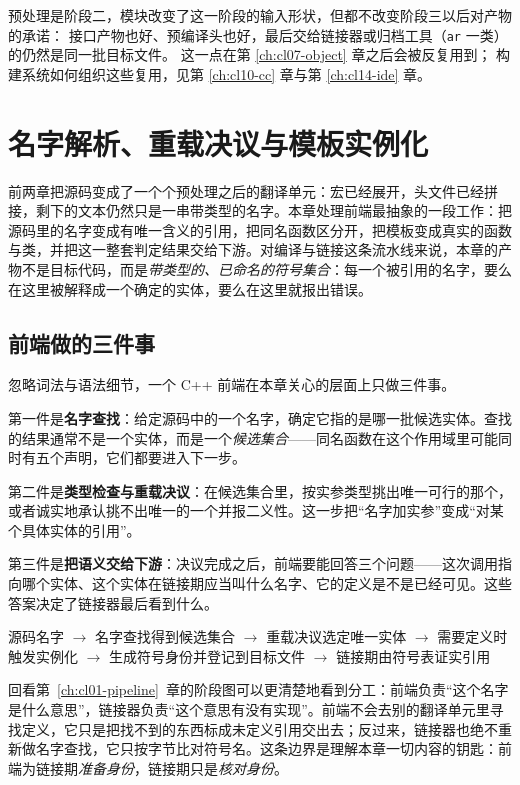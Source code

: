 \documentclass[12pt,a4paper,fontset=fandol]{ctexbook}
\newcommand{\cpp}[1]{C++#1}
\newcommand{\Tool}[1]{\texttt{#1}}
\begin{document}
预处理是阶段二，模块改变了这一阶段的输入形状，但都不改变阶段三以后对产物的承诺：
接口产物也好、预编译头也好，最后交给链接器或归档工具（\Tool{ar} 一类）的仍然是同一批目标文件。
这一点在第 \ref{ch:cl07-object} 章之后会被反复用到；
构建系统如何组织这些复用，见第 \ref{ch:cl10-cc} 章与第 \ref{ch:cl14-ide} 章。

\chapter{名字解析、重载决议与模板实例化}\label{ch:cl03-resolution}

前两章把源码变成了一个个预处理之后的翻译单元：宏已经展开，头文件已经拼接，剩下的文本仍然只是一串带类型的名字。本章处理前端最抽象的一段工作：把源码里的名字变成有唯一含义的引用，把同名函数区分开，把模板变成真实的函数与类，并把这一整套判定结果交给下游。对编译与链接这条流水线来说，本章的产物不是目标代码，而是\emph{带类型的、已命名的符号集合}：每一个被引用的名字，要么在这里被解释成一个确定的实体，要么在这里就报出错误。

\section{前端做的三件事}\label{sec:cl03-frontend-duty}

忽略词法与语法细节，一个 \cpp{} 前端在本章关心的层面上只做三件事。

第一件是\textbf{名字查找}：给定源码中的一个名字，确定它指的是哪一批候选实体。查找的结果通常不是一个实体，而是一个\emph{候选集合}——同名函数在这个作用域里可能同时有五个声明，它们都要进入下一步。

第二件是\textbf{类型检查与重载决议}：在候选集合里，按实参类型挑出唯一可行的那个，或者诚实地承认挑不出唯一的一个并报二义性。这一步把“名字加实参”变成“对某个具体实体的引用”。

第三件是\textbf{把语义交给下游}：决议完成之后，前端要能回答三个问题——这次调用指向哪个实体、这个实体在链接期应当叫什么名字、它的定义是不是已经可见。这些答案决定了链接器最后看到什么。

\begin{flow}[title={从源码名字到链接期身份：前端的三段准备}]
源码名字 $\to$ 名字查找得到候选集合 $\to$ 重载决议选定唯一实体 $\to$ 需要定义时触发实例化 $\to$ 生成符号身份并登记到目标文件 $\to$ 链接期由符号表证实引用
\end{flow}

回看第~\ref{ch:cl01-pipeline}~章的阶段图可以更清楚地看到分工：前端负责“这个名字是什么意思”，链接器负责“这个意思有没有实现”。前端不会去别的翻译单元里寻找定义，它只是把找不到的东西标成未定义引用交出去；反过来，链接器也绝不重新做名字查找，它只按字节比对符号名。这条边界是理解本章一切内容的钥匙：前端为链接期\emph{准备身份}，链接期只是\emph{核对身份}。
\end{document}
